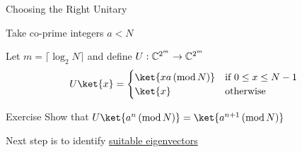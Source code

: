 \documentclass{beamer}
\begin{document}
\begin{frame}{Choosing the Right Unitary}

        Take co-prime integers $a < N$

        Let $m = \lceil \log_2 N \rceil$ and define
        $U : \mathbb{C}^{2^m} \to \mathbb{C}^{2^m}$
        \[
                U \ket{x} = \begin{cases}
                        \ket{ x a \, (\mathrm{mod} \, N)} & \text{if }
                        0 \leq x \leq N -1 \\
                        \ket{x} & \text{otherwise}
                \end{cases}
        \]

        \begin{block}{Exercise}
                Show that $U \ket{a^n \, (\mathrm{mod} \, N)} = 
                \ket{a^{n+1} \, (\mathrm{mod} \, N)}$
        \end{block}

        \pause
        Next step is to identify \alert{\underline{suitable eigenvectors}}
\end{frame}
\end{document}
